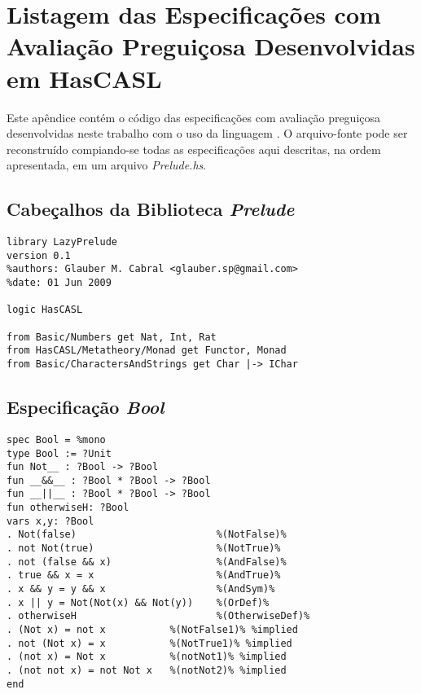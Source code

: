 \chapter{Listagem das Especificações com Avaliação Preguiçosa Desenvolvidas em HasCASL}
\label{appendix:lazySpec}
Este apêndice contém o código das especificações com avaliação preguiçosa desenvolvidas neste trabalho com o uso da linguagem \HasCASL.
O arquivo-fonte pode ser reconstruído compiando-se todas as especificações aqui descritas, na ordem apresentada, em um arquivo \textit{Prelude.hs}.

\section{Cabeçalhos da Biblioteca \textit{Prelude}}
\label{appendix:lazySpec:header}
\begin{Verbatim}
library LazyPrelude
version 0.1
%authors: Glauber M. Cabral <glauber.sp@gmail.com>
%date: 01 Jun 2009

logic HasCASL 

from Basic/Numbers get Nat, Int, Rat
from HasCASL/Metatheory/Monad get Functor, Monad
from Basic/CharactersAndStrings get Char |-> IChar
\end{Verbatim}

\section{Especificação \textit{Bool}}
\label{appendix:lazySpec:bool}
\begin{Verbatim}
spec Bool = %mono
type Bool := ?Unit 
fun Not__ : ?Bool -> ?Bool
fun __&&__ : ?Bool * ?Bool -> ?Bool
fun __||__ : ?Bool * ?Bool -> ?Bool
fun otherwiseH: ?Bool      
vars x,y: ?Bool
. Not(false)                        %(NotFalse)%
. not Not(true)                     %(NotTrue)%
. not (false && x)                  %(AndFalse)%
. true && x = x                     %(AndTrue)%
. x && y = y && x                   %(AndSym)%
. x || y = Not(Not(x) && Not(y))    %(OrDef)%
. otherwiseH                        %(OtherwiseDef)%
. (Not x) = not x           %(NotFalse1)% %implied
. not (Not x) = x           %(NotTrue1)% %implied
. (not x) = Not x           %(notNot1)% %implied
. (not not x) = not Not x   %(notNot2)% %implied
end
\end{Verbatim}


